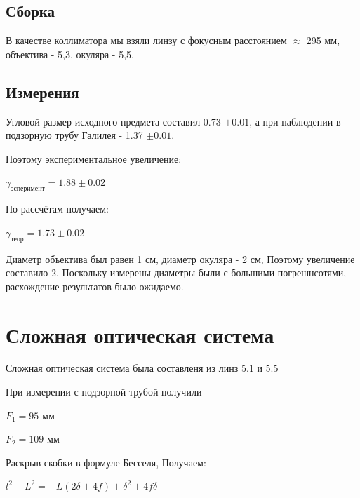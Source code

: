 \documentclass{article}
\begin{document}
\subsection{Сборка} В качестве коллиматора мы взяли линзу с фокусным расстоянием $\approx$ 295 мм, объектива - 5,3, окуляра - 5,5.

\subsection{Измерения}

Угловой размер исходного предмета составил 0.73 $\pm 0.01$, а при наблюдении в подзорную трубу Галилея - 1.37 $\pm 0.01$.

Поэтому экспериментальное увеличение:

\begin{center}
    $\gamma_{эсперимент} = 1.88 \pm 0.02$
\end{center}

По рассчётам получаем:


\begin{center}
    $\gamma_{теор} = 1.73 \pm 0.02$
\end{center}

Диаметр объектива был равен 1 см, диаметр окуляра - 2 см, Поэтому увеличение составило 2. Поскольку измерены диаметры были с большими погрешнсотями, расхождение результатов было ожидаемо.

\section{Сложная оптическая система}

Сложная оптическая система была составленя из линз 5.1 и 5.5




При измерении с подзорной трубой получили 

\begin{center}
    $F_1 = 95$ мм

    $F_2 = 109$ мм
\end{center}


Раскрыв скобки в формуле Бесселя, Получаем:

\begin{center}
    $l^2 - L^2 = -L(2\delta+4f) + \delta^2 + 4f\delta$
\end{center}
\end{document}
